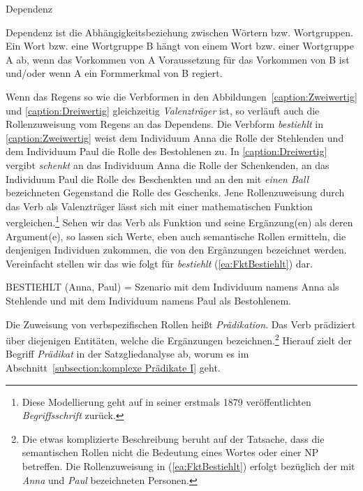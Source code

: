 \begin{Definition}{Dependenz}
    
\noindent 
Dependenz ist die Abhängigkeitsbeziehung zwischen Wörtern bzw. Wortgruppen. Ein Wort bzw. eine Wortgruppe B hängt von einem Wort bzw. einer Wortgruppe A ab, wenn das Vorkommen von A Voraussetzung für das Vorkommen von B ist und/oder wenn A ein Formmerkmal von B regiert.
\end{Definition}



Wenn das Regens so wie die Verbformen in den Abbildungen~\ref{caption:Zweiwertig} und \ref{caption:Dreiwertig} gleichzeitig \textit{Valenzträger} ist, so verläuft auch die Rollenzuweisung vom Regens an das Dependens. Die Verbform \textit{bestiehlt} in \ref{caption:Zweiwertig} weist dem Individuum Anna die Rolle der Stehlenden und dem Individuum Paul die Rolle des Bestohlenen zu. In \ref{caption:Dreiwertig} vergibt \textit{schenkt} an das Individuum Anna die Rolle der Schenkenden, an das Individuum Paul die Rolle des Beschenkten und an den mit \textit{einen Ball} bezeichneten Gegenstand die Rolle des Geschenks. Jene Rollenzuweisung durch das Verb als Valenzträger lässt sich mit einer mathematischen Funktion vergleichen.\footnote{Diese Modellierung geht auf \citet[XIII, 2]{Frege1993_1879} in seiner erstmals 1879 veröffentlichten \textit{Begriffsschrift} zurück.} Sehen wir das Verb als Funktion und seine Ergänzung(en) als deren Argument(e), so lassen sich Werte, eben auch semantische Rollen ermitteln, die denjenigen Individuen zukommen, die von den Ergänzungen bezeichnet werden. Vereinfacht stellen wir das wie folgt für \textit{bestiehlt} (\ref{ea:FktBestiehlt}) dar.

\ea \label{ea:FktBestiehlt} BESTIEHLT (Anna, Paul) = Szenario mit dem Individuum namens Anna als Stehlende und mit dem Individuum namens Paul als Bestohlenem.
\z 

Die Zuweisung von verbspezifischen Rollen heißt \textit{Prädikation}. Das Verb prädiziert über diejenigen Entitäten, welche die Ergänzungen bezeichnen.\footnote{Die etwas komplizierte Beschreibung beruht auf der Tatsache, dass die semantischen Rollen nicht die Bedeutung eines Wortes oder einer NP betreffen. Die Rollenzuweisung in (\ref{ea:FktBestiehlt}) erfolgt bezüglich der mit \textit{Anna} und \textit{Paul} bezeichneten Personen.} Hierauf zielt der Begriff \textit{Prädikat} in der Satzgliedanalyse ab, worum es im Abschnitt~\ref{subsection:komplexe Prädikate I} geht.


